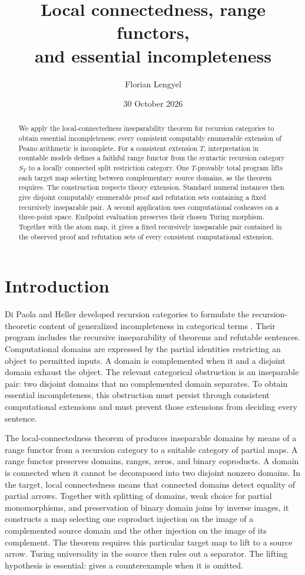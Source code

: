 \documentclass[11pt]{article}
\title{Local connectedness, range functors,\\
and essential incompleteness}
\author{Florian Lengyel}
\date{30 October 2026}
\begin{document}
\maketitle

\begin{abstract}
We apply the local-connectedness inseparability theorem for recursion
categories to obtain essential incompleteness: every consistent computably
enumerable extension of Peano arithmetic is incomplete. For a consistent
extension $T$, interpretation in countable models defines a faithful range
functor from the syntactic
recursion category $S_T$ to a locally connected split restriction
category. One $T$-provably total program lifts each target map selecting
between complementary source domains, as the theorem requires.
The construction respects theory extension. Standard numeral instances
then give disjoint computably enumerable proof and refutation sets
containing a fixed recursively inseparable pair. A second application
uses computational cosheaves on a three-point space. Endpoint evaluation
preserves their chosen Turing morphism. Together with the atom map, it
gives a fixed recursively inseparable pair contained in the observed
proof and refutation sets of every consistent computational extension.
\end{abstract}

\section{Introduction}

Di Paola and Heller developed recursion categories to formulate the
recursion-theoretic content of generalized incompleteness in categorical
terms \cite{DPH}. Their program includes the recursive inseparability
of theorems and refutable sentences. Computational domains are expressed
by the partial identities restricting an object to permitted inputs.
A domain is complemented when it and a disjoint domain exhaust the
object. The relevant categorical obstruction is an inseparable pair:
two disjoint domains that no complemented domain separates.
To obtain essential incompleteness, this
obstruction must persist through consistent computational extensions
and must prevent those extensions from deciding every sentence.

The local-connectedness theorem of \cite{LOC} produces inseparable
domains by means of a range functor from a recursion category to a
suitable category of partial maps. A range functor preserves domains,
ranges, zeros, and binary coproducts. A domain is connected when it
cannot be decomposed into two disjoint nonzero domains. In the target,
local connectedness means that connected domains detect equality of
partial arrows.
Together with splitting of domains, weak choice for partial
monomorphisms, and preservation of binary domain joins by inverse
images, it constructs a map selecting one coproduct injection on the
image of a complemented source domain and the other injection on the
image of its complement. The theorem requires this particular target
map to lift to a source arrow. Turing universality in the source then
rules out a separator. The lifting hypothesis is essential:
\cite[Section 4.5]{LOC} gives a counterexample when it is omitted.
\end{document}
